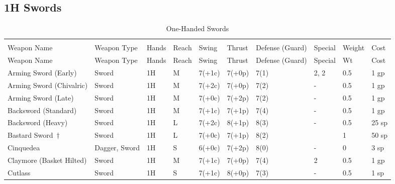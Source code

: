 \documentclass[oneside,11pt,english]{book}
\begin{document}
\subsection{1H Swords}\vspace{-15pt}
\begin{longtabu} to 1\linewidth {X[2,l]XX[-1,c]X[-1,c]XXX[-1,c]X[2,l]X[-3,c]X[-3,r]}
	\captionsetup{labelformat=blank,textformat=empty}
	\caption{One-Handed Swords}\vspace{-15pt}
	\label{tab:1H Swords}\\
		Weapon Name						&Weapon Type	&Hands&Reach&Swing&Thrust&Defense (Guard)&Special						&Weight	&Cost\\\toprule\endfirsthead
Weapon Name					&Weapon Type    &Hands   &Reach  &Swing  &Thrust &Defense (Guard)  &Special                                 &Wt  &Cost\\\toprule\endhead
Arming Sword (Early)        &Sword          &1H      &M      &7(+1c) &7(+0p) &7(1)           & 2,  2                 &0.5 &1 gp\\
Arming Sword (Chivalric)    &Sword          &1H      &M      &7(+2c) &7(+0p) &7(2)           &-                                       &0.5 &1 gp\\
Arming Sword (Late)         &Sword          &1H      &M      &7(+0c) &7(+2p) &7(2)           &-                                       &0.5 &1 gp\\
Backsword (Standard)        &Sword          &1H      &M      &7(+1c) &7(+1p) &7(4)           &-                                       &0.5 &1 gp\\
Backsword (Heavy)           &Sword          &1H      &L      &7(+2c) &8(+1p) &8(3)           &-                                       &0.5 &25 sp\\
{Bastard Sword\  \label{wep:bastard-sword-1h}}\hyperref[wep:bastard-sword-2h]{$ \dagger $}              &Sword          &1H      &L      &7(+0c) &7(+1p) &8(2)           &                            &1   &50 sp\\
Cinquedea                   &Dagger, Sword  &1H      &S      &6(+0c) &7(+2p) &8(0)           &-                                       &0   &3 sp\\
Claymore (Basket Hilted)	&Sword		&1H      &M      &7(+1c) &7(+0p) &7(4)           & 2                           &0.5 &1 gp\\
Cutlass						&Sword          &1H      &S      &7(+1c) &8(+0p) &7(3)           &-                                       &0.5 &1 sp\\

\end{longtabu}
\end{document}
